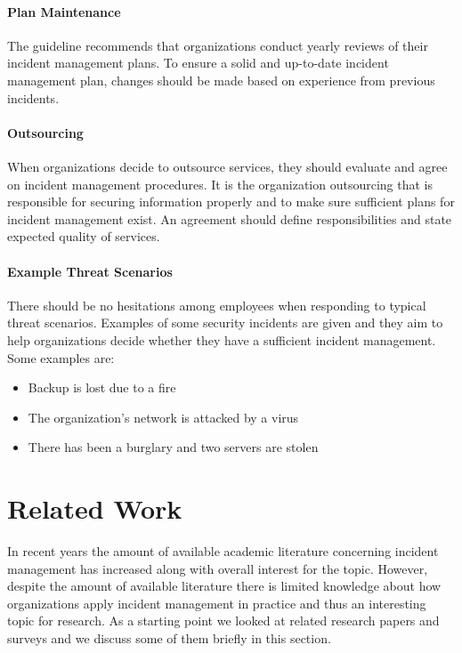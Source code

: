 \paragraph{Plan Maintenance}
The guideline recommends that organizations conduct yearly reviews of their incident management plans. To ensure a solid and up-to-date incident management plan, changes should be made based on experience from previous incidents. 

\paragraph{Outsourcing}
When organizations decide to outsource services, they should evaluate and agree on incident management procedures. It is the organization outsourcing that is responsible for securing information properly and to make sure sufficient plans for incident management exist. An agreement should define responsibilities and state expected quality of services. 

\paragraph{Example Threat Scenarios}
There should be no hesitations among employees when responding to typical threat scenarios. Examples of some security incidents are given and they aim to help organizations decide whether they have a sufficient incident management. Some examples are:
\begin{itemize}
\item Backup is lost due to a fire
\item The organization's network is attacked by a virus
\item There has been a burglary and two servers are stolen 
\end{itemize}



\section{Related Work}
In recent years the amount of available academic literature concerning incident management has increased along with overall interest for the topic. However, despite the amount of available literature there is limited knowledge about how organizations apply incident management in practice and thus an interesting topic for research. As a starting point we looked at related research papers and surveys and we discuss some of them briefly in this section.

